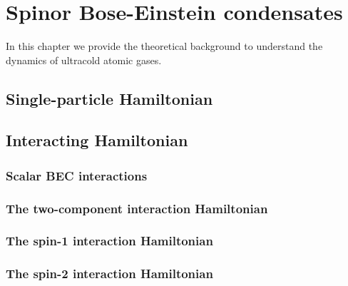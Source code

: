\chapter{Spinor Bose-Einstein condensates}

In this chapter we provide the theoretical background to understand the 
dynamics of ultracold atomic gases.


\section{Single-particle Hamiltonian}

\section{Interacting Hamiltonian}

\subsection{Scalar BEC interactions}

\subsection{The two-component interaction Hamiltonian}

\subsection{The spin-1 interaction Hamiltonian}

\subsection{The spin-2 interaction Hamiltonian}
